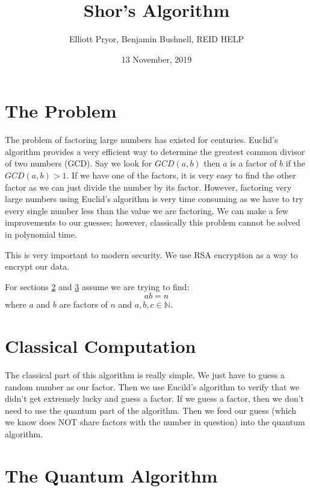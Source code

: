 \documentclass[a4paper]{article}
\title{Shor's Algorithm}
\author{Elliott Pryor, Benjamin Bushnell, REID HELP}
\date{13 November, 2019}
\begin{document}
\maketitle %
\section{The Problem}
The problem of factoring large numbers has existed for centuries. Euclid's algorithm provides a very efficient way to determine the greatest common divisor of two numbers (GCD). Say we look for $GCD(a,b)$ then $a$ is a factor of $b$ if the $GCD(a, b) > 1$. If we have one of the factors, it is very easy to find the other factor as we can just divide the number by its factor. However, factoring very large numbers using Euclid's algorithm is very time consuming as we have to try every single number less than the value we are factoring. We can make a few improvements to our guesses; however, classically this problem cannot be solved in polynomial time.

This is very important to modern security. We use RSA encryption as a way to encrypt our data. 

For sections \ref{classicalSec} and \ref{quantumSec} assume we are trying to find: 
$$ab = n$$
where $a$ and $b$ are factors of $n$ and $a,b,c \in \mathbb{N}$.

\section{Classical Computation}
\label{classicalSec}
The classical part of this algorithm is really simple. We just have to guess a random number as our factor. Then we use Eucild's algorithm to verify that we didn't get extremely lucky and guess a factor. If we guess a factor, then we don't need to use the quantum part of the algorithm. Then we feed our guess (which we know does NOT share factors with the number in question) into the quantum algorithm. 


\section{The Quantum Algorithm}
\label{quantumSec}
\end{document}
